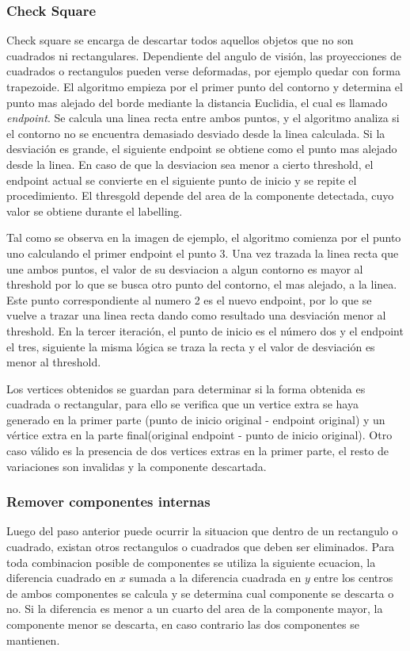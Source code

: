 \documentclass[runningheads]{llncs}
\begin{document}
\subsubsection{Check Square}	

Check square se encarga de descartar todos aquellos objetos que no son cuadrados ni rectangulares. Dependiente del angulo de visión, las proyecciones de cuadrados o rectangulos pueden verse deformadas, por ejemplo quedar con forma trapezoide. El algoritmo empieza por el primer punto del contorno y determina el punto mas alejado del borde mediante la distancia Euclidia, el cual es llamado \textit{endpoint}. Se calcula una linea recta entre ambos puntos, y el algoritmo analiza si el contorno no se encuentra demasiado desviado desde la linea calculada. Si la desviación es grande, el siguiente endpoint se obtiene como el punto mas alejado desde la linea. En caso de que la desviacion sea menor a cierto threshold, el endpoint actual se convierte en el siguiente punto de inicio y se repite el procedimiento. El thresgold depende del area de la componente detectada, cuyo valor se obtiene durante el labelling.

Tal como se observa en la imagen de ejemplo, el algoritmo comienza por el punto uno calculando el primer endpoint el punto 3. Una vez trazada la linea recta que une ambos puntos, el valor de su desviacion a algun contorno es mayor al threshold por lo que se busca otro punto del contorno, el mas alejado, a la linea. Este punto correspondiente al numero 2 es el nuevo endpoint, por lo que se vuelve a trazar una linea recta dando como resultado una desviación menor al threshold. En la tercer iteración, el punto de inicio es el número dos
y el endpoint el tres, siguiente la misma lógica se traza la recta y el valor de desviación es menor al threshold.

Los vertices obtenidos se guardan para determinar si la forma obtenida es cuadrada o rectangular, para ello se verifica que un vertice extra se haya generado en la primer parte (punto de inicio original - endpoint original) y un vértice extra en la parte final(original endpoint - punto de inicio original). Otro caso válido es la presencia de dos vertices extras en la primer parte, el resto de variaciones son invalidas y la componente descartada.

\subsubsection{Remover componentes internas}
Luego del paso anterior puede ocurrir la situacion que dentro de un rectangulo o cuadrado, existan otros rectangulos o cuadrados que deben ser eliminados. Para toda combinacion posible de componentes se utiliza la siguiente ecuacion, la diferencia cuadrado en $x$ sumada a la diferencia cuadrada en $y$ entre los centros de ambos componentes se calcula y se determina cual componente se descarta o no. Si la diferencia es menor a un cuarto del area de la componente mayor, la componente menor se descarta, en caso contrario las dos componentes se mantienen.
\end{document}
